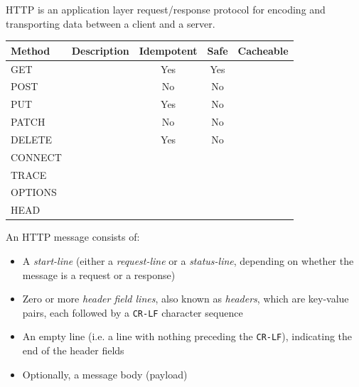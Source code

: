 \documentclass[12pt, titlepage]{article}
\begin{document}
HTTP is an application layer request/response protocol for encoding and transporting data between a client and a server.

\begin{table}
  \begin{center}
    \begin{tabular}{|l|l|c|c|l|}
      \hline
      \textbf{Method} & \textbf{Description} & \textbf{Idempotent} & \textbf{Safe} & \textbf{Cacheable} \\ \hline
      GET & & Yes & Yes & \\ \hline
      POST & & No & No & \\ \hline
      PUT & & Yes & No & \\ \hline
      PATCH & & No & No & \\ \hline
      DELETE & & Yes & No & \\ \hline
      CONNECT & & & & \\ \hline
      TRACE & & & & \\ \hline
      OPTIONS & & & & \\ \hline
      HEAD & & & & \\ \hline
    \end{tabular}
  \end{center}
\end{table}

An HTTP message consists of:
\begin{itemize}
  \item A \textit{start-line} (either a \textit{request-line} or a \textit{status-line}, depending on whether the message is a request or a response)
  \item Zero or more \textit{header field lines}, also known as \textit{headers}, which are key-value pairs, each followed by a \texttt{CR-LF} character sequence
  \item An empty line (i.e. a line with nothing preceding the \texttt{CR-LF}), indicating the end of the header fields
  \item Optionally, a message body (payload) \\
\end{itemize}
\end{document}
